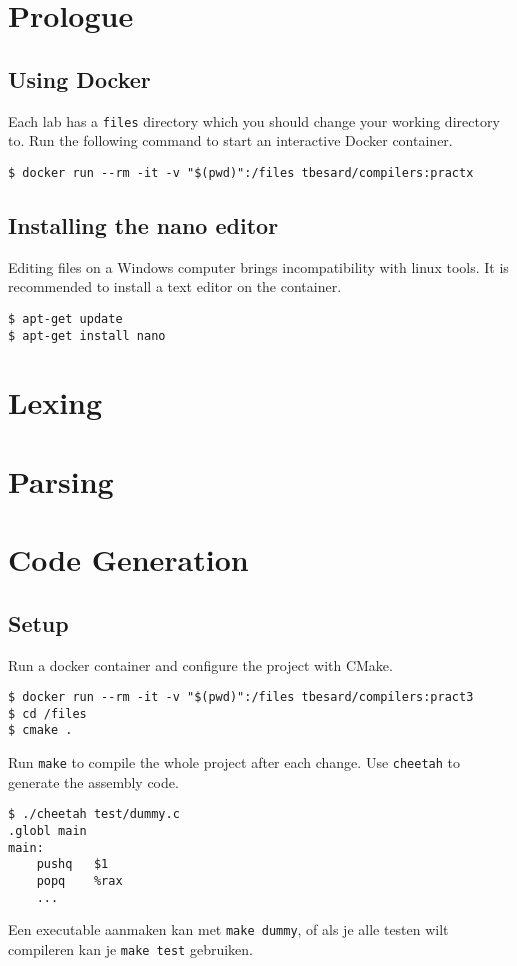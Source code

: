 \documentclass{report}
\begin{document}
	\tableofcontents
	

	\chapter{Prologue}
	\section{Using Docker}
	Each lab has a \texttt{files} directory which you should change your working directory to. Run the following command to start an interactive Docker container. 
	\begin{lstlisting}
$ docker run --rm -it -v "$(pwd)":/files tbesard/compilers:practx
	\end{lstlisting}
	\section{Installing the nano editor}
	Editing files on a Windows computer brings incompatibility with linux tools. It is recommended to install a text editor on the container.
	\begin{lstlisting}
$ apt-get update
$ apt-get install nano
	\end{lstlisting}
	\chapter{Lexing}
	\chapter{Parsing}
	\chapter{Code Generation}
	

	\section{Setup}
	Run a docker container and configure the project with CMake.
	\begin{lstlisting}
$ docker run --rm -it -v "$(pwd)":/files tbesard/compilers:pract3
$ cd /files
$ cmake .
	\end{lstlisting}
	Run \texttt{make} to compile the whole project after each change. Use \texttt{cheetah} to generate the assembly code.
	\begin{lstlisting}
$ ./cheetah test/dummy.c
.globl main
main:
	pushq	$1
	popq	%rax
	...
	\end{lstlisting}
	Een executable aanmaken kan met \texttt{make dummy}, of als je alle testen wilt compileren kan je \texttt{make test} gebruiken.
	
\end{document}
